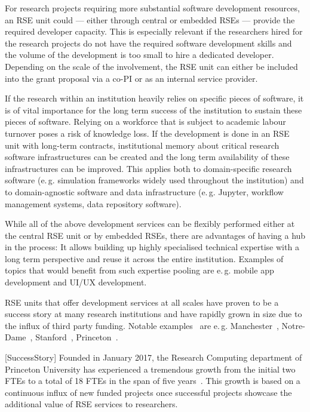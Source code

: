 \documentclass[a4paper]{article}
\makeatletter
\newcommand*{\eg}{e.\,g.\@\xspace}
\makeatother
\begin{document}
For research projects requiring more substantial software development resources, an RSE unit could --- either through central or embedded RSEs --- provide the required developer capacity.
This is especially relevant if the researchers hired for the research projects do not have the required software development skills and the volume of the development is too small to hire a dedicated developer.
Depending on the scale of the involvement, the RSE unit can either be included into the grant proposal via a co-PI or as an internal service provider.

If the research within an institution heavily relies on specific pieces of software,
it is of vital importance for the long term success of the institution to sustain these pieces of software.
Relying on a workforce that is subject to academic labour turnover poses a risk of knowledge loss.
If the development is done in an RSE unit with long-term contracts, institutional memory about critical research software infrastructures can be created and the long term availability of these infrastructures can be improved.
This applies both to domain-specific research software (\eg{} simulation frameworks widely used throughout the institution)
and to domain-agnostic software and data infrastructure (\eg{} Jupyter, workflow management systems, data repository software).

While all of the above development services can be flexibly performed either at the central RSE unit or by embedded RSEs, there are advantages of having a hub in the process:
It allows building up highly specialised technical expertise with a long term perspective and reuse it across the entire institution.
Examples of topics that would benefit from such expertise pooling are \eg{} mobile app development and UI/UX development.

RSE units that offer development services at all scales have proven to be a success story at many research institutions and have rapidly grown in size due to the influx of third party funding.
Notable examples~\autocite{Katz2019} are \eg{} Manchester~\autocite{Sinclair2022}, Notre-Dame~\autocite{NotreDame2025}, Stanford~\autocite{Stanford2025}, Princeton~\autocite{Princeton2025, Cosden2022a}.

[SuccessStory]
Founded in January 2017, the Research Computing department of Princeton University has experienced a tremendous growth from the initial two FTEs to a total of 18 FTEs in the span of five years~\autocite{Cosden2022a}.
This growth is based on a continuous influx of new funded projects once successful projects showcase the additional value of RSE services to researchers.
\end{document}
